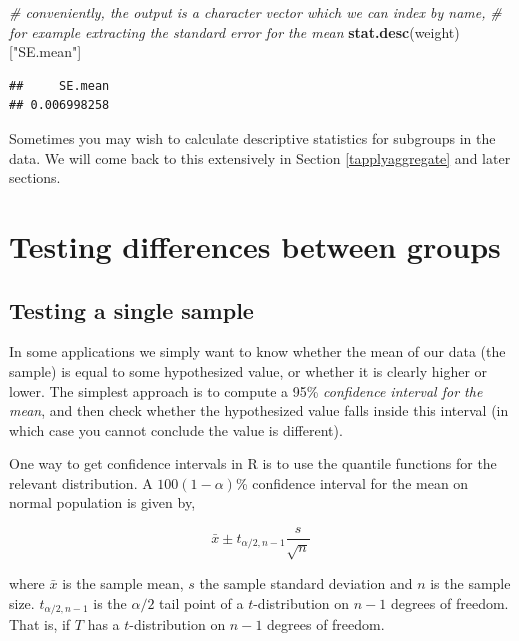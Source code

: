 \documentclass[]{book}
\newenvironment{Shaded}{\begin{snugshade}}{\end{snugshade}}
\newcommand{\CommentTok}[1]{\textcolor[rgb]{0.56,0.35,0.01}{\textit{#1}}}
\newcommand{\KeywordTok}[1]{\textcolor[rgb]{0.13,0.29,0.53}{\textbf{#1}}}
\newcommand{\NormalTok}[1]{#1}
\newcommand{\StringTok}[1]{\textcolor[rgb]{0.31,0.60,0.02}{#1}}
\begin{document}
\begin{Shaded}
\begin{Highlighting}[]
\CommentTok{# conveniently, the output is a character vector which we can index by name,}
\CommentTok{# for example extracting the standard error for the mean}
\KeywordTok{stat.desc}\NormalTok{(weight)[}\StringTok{"SE.mean"}\NormalTok{]}
\end{Highlighting}
\end{Shaded}

\begin{verbatim}
##     SE.mean 
## 0.006998258
\end{verbatim}

Sometimes you may wish to calculate descriptive statistics for subgroups in the data. We will come back to this extensively in Section \ref{tapplyaggregate} and later sections.

\hypertarget{testing-differences-between-groups}{%
\section{Testing differences between groups}\label{testing-differences-between-groups}}

\hypertarget{singlesample}{%
\subsection{Testing a single sample}\label{singlesample}}

In some applications we simply want to know whether the mean of our data (the sample) is equal to some hypothesized value, or whether it is clearly higher or lower. The simplest approach is to compute a 95\% \emph{confidence interval for the mean}, and then check whether the hypothesized value falls inside this interval (in which case you cannot conclude the value is different).

One way to get confidence intervals in R is to use the quantile functions for the relevant distribution. A \(100(1-\alpha)\)\% confidence interval for the mean on normal population is given by,

\[\bar{x} \pm t_{\alpha/2, n-1} \frac{s}{\sqrt{n}}\]

where \(\bar{x}\) is the sample mean, \(s\) the sample standard deviation and \(n\) is the sample size. \(t_{\alpha/2, n-1}\) is the \(\alpha/2\) tail point of a \(t\)-distribution on \(n-1\) degrees of freedom. That is, if \(T\) has a \(t\)-distribution on \(n-1\) degrees of freedom.
\end{document}
